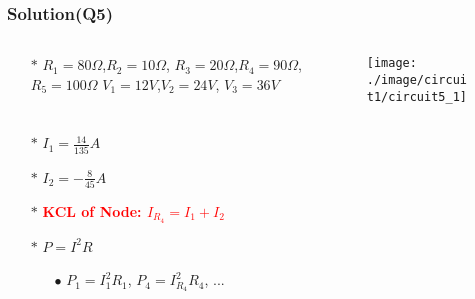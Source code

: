 \documentclass{beamer}
\newcommand{\red}[1]{\textcolor{red}{#1}}
\begin{document}
\begin{frame}
\frametitle{Solution(Q5)}
\begin{columns}
\begin{column}{5cm}
\begin{itemize} \itemsep1pt \parskip0pt 
  \item[$\ast$]  $R_1 = 80\Omega$,$R_2 = 10\Omega$,\newline
  $R_3 = 20\Omega$,$R_4 = 90\Omega$,\newline
  $R_5 = 100\Omega$ \newline
  $V_1 = 12V$,$V_2 = 24V$,\newline
  $V_3 = 36V$
\end{itemize}
\end{column}



\begin{column}{8cm}
\begin{figure}[H]
  \centering
  \texttt{[image: ./image/circuit1/circuit5\_1]}
\end{figure}
\end{column}
\end{columns}

\begin{itemize} \itemsep1pt \parskip0pt 
  \item[$\ast$] $I_1 = \frac{14}{135}A$
  \item[$\ast$] $I_2 = -\frac{8}{45}A$
  \item[$\ast$] \red{\bf{KCL of Node: $I_{R_4} = I_1 + I_2$}}
  \item[$\ast$] $P = I^2R$
  \begin{itemize} \itemsep1pt \parskip0pt 
    \item[$\bullet$] $P_1 = I_1^2R_1$, $P_4 = I_{R_4}^2R_4$, ...
  \end{itemize}
\end{itemize}

\end{frame}

\end{document}
